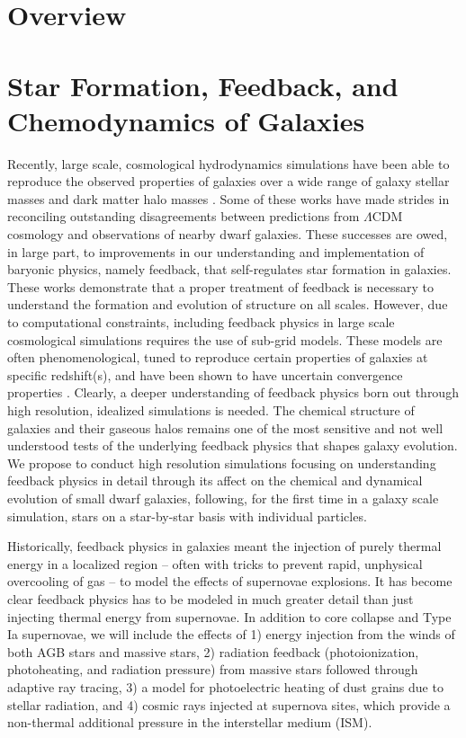\documentclass[11pt]{article}
\newcommand{\eg}{e.g.,}
\begin{document}
\maketitle

\section{Overview}

\section{Star Formation, Feedback, and Chemodynamics of Galaxies}

Recently, large scale, cosmological hydrodynamics simulations have been able to reproduce the observed properties of galaxies over a wide range of galaxy stellar masses and dark matter halo masses \citep[\eg][]{MUGS2010, MAGICC2013, Illustris1, Illustris2, OWLS, EAGLE, FIRE, APOSTLE, Latte}. Some of these works have made strides in reconciling outstanding disagreements between predictions from $\Lambda$CDM cosmology and observations of nearby dwarf galaxies. These successes are owed, in large part, to improvements in our understanding and implementation of baryonic physics, namely feedback, that self-regulates star formation in galaxies. These works demonstrate that a proper treatment of feedback is necessary to understand the formation and evolution of structure on all scales. However, due to computational constraints, including feedback physics in large scale cosmological simulations requires the use of sub-grid models. These models are often phenomenological, tuned to reproduce certain properties of galaxies at specific redshift(s), and have been shown to have uncertain convergence properties \citep[\eg][]{Rosdahl2016}. Clearly, a deeper understanding of feedback physics born out through high resolution, idealized simulations is needed. The chemical structure of galaxies and their gaseous halos remains one of the most sensitive and not well understood tests of the underlying feedback physics that shapes galaxy evolution. We propose to conduct high resolution simulations focusing on understanding feedback physics in detail through its affect on the chemical and dynamical evolution of small dwarf galaxies, following, for the first time in a galaxy scale simulation, stars on a star-by-star basis with individual particles. 

Historically, feedback physics in galaxies meant the injection of purely thermal energy in a localized region -- often with tricks to prevent rapid, unphysical overcooling of gas -- to model the effects of supernovae explosions. It has become clear feedback physics has to be modeled in much greater detail than just injecting thermal energy from supernovae. In addition to core collapse and Type Ia supernovae, we will include the effects of 1) energy injection from the winds of both AGB stars and massive stars, 2) radiation feedback (photoionization, photoheating, and radiation pressure) from massive stars followed through adaptive ray tracing, 3) a model for photoelectric heating of dust grains due to stellar radiation, and 4) cosmic rays injected at supernova sites, which provide a non-thermal additional pressure in the interstellar medium (ISM).
\end{document}
